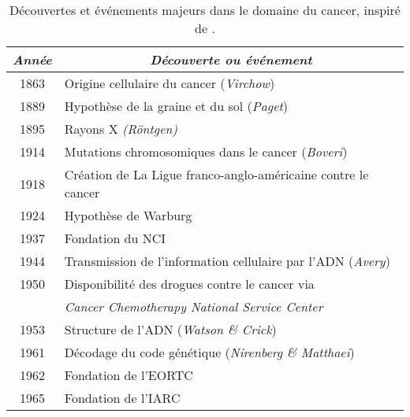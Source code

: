       \begin{table}
        \begin{center}
          \caption{Découvertes et événements majeurs dans le domaine du cancer, inspiré de \citet{Devita2012}.}
          \begin{tabular}{cl}
            \toprule
            \emph{Année}  & \multicolumn{1}{c}{\emph{Découverte ou événement}}                                      \\
            \midrule
            1863          & Origine cellulaire du cancer (\emph{Virchow})                                           \\
            1889          & Hypothèse de la graine et du sol (\emph{Paget})                                         \\
            1895          & Rayons X \emph{(Röntgen)}                                                               \\
            1914          & Mutations chromosomiques dans le cancer (\emph{Boveri})                                 \\
            1918          & Création de La Ligue franco-anglo-américaine contre le cancer                           \\
            1924          & Hypothèse de Warburg                                                                    \\
            1937          & Fondation du \ac{NCI}                                                                   \\
            1944          & Transmission de l'information cellulaire par l'\acs{ADN} (\emph{Avery})                 \\
            1950          & Disponibilité des drogues contre le cancer via                                          \\
                          & \emph{Cancer Chemotherapy National Service Center}                                      \\
            1953          & Structure de l'\acs{ADN} (\emph{Watson \& Crick})                                       \\
            1961          & Décodage du code génétique (\emph{Nirenberg \& Matthaei})                               \\
            1962          & Fondation de l'\ac{EORTC}                                                               \\
            1965          & Fondation de l'\ac{IARC}                                                                \\

\end{tabular}
\end{center}
\end{table}
